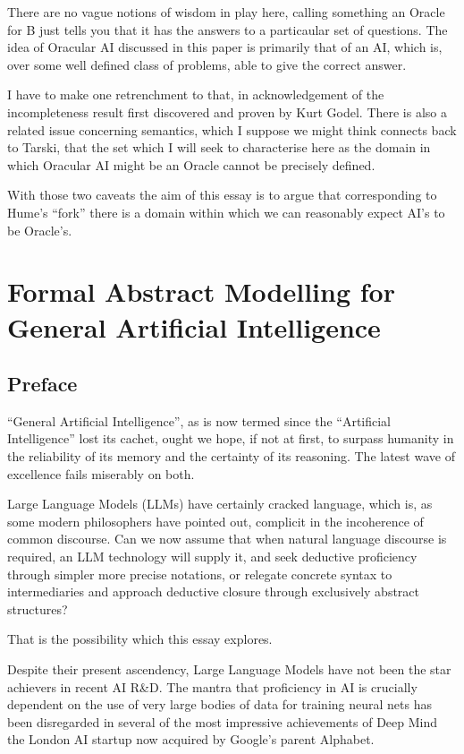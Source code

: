 \documentclass[10pt,titlepage]{book}
\begin{document}
There are no vague notions of wisdom in play here, calling something an Oracle for B just tells you that it has the answers to a particaular set of questions.
The idea of Oracular AI discussed in this paper is primarily that of an AI, which is, over some well defined class of problems, able to give the correct answer.

I have to make one retrenchment to that, in acknowledgement of the incompleteness result first discovered and proven by Kurt Godel.
There is also a related issue concerning semantics, which I suppose we might think connects back to Tarski, that the set which I will seek to characterise here as the domain in which Oracular AI might be an Oracle cannot be precisely defined.

With those two caveats the aim of this essay is to argue that corresponding to Hume's ``fork'' there is a domain within which we can reasonably expect AI's to be Oracle's.

\chapter{Formal Abstract Modelling for General Artificial Intelligence}

\section{Preface}

``General Artificial Intelligence'', as is now termed since the ``Artificial Intelligence'' lost its cachet, ought we hope, if not at first, to surpass humanity in the reliability of its memory and the certainty of its reasoning.
The latest wave of excellence fails miserably on both.

Large Language Models (LLMs) have certainly cracked language, which is, as some modern philosophers have pointed out, complicit in the incoherence of common discourse.
Can we now assume that when natural language discourse is required, an LLM technology will supply it, and seek deductive proficiency through simpler more precise notations, or relegate concrete syntax to intermediaries and approach deductive closure through exclusively abstract structures?

That is the possibility which this essay explores.

Despite their present ascendency, Large Language Models have not been the star achievers in recent AI R\&D.
The mantra that proficiency in AI is crucially dependent on the use of very large bodies of data for training neural nets has been disregarded in several of the most impressive achievements of Deep Mind the London AI startup now acquired by Google's parent Alphabet.
\end{document}
